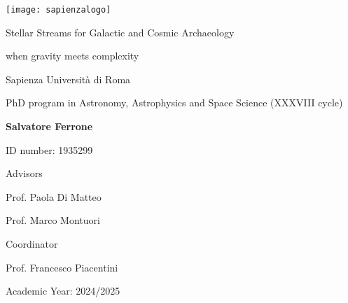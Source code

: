 \begin{titlepage}
\linespread{1}\selectfont
{}
\sffamily
\setlength{\parindent}{0pt}

\vspace*{-10mm}

\texttt{[image: sapienzalogo]}

\vspace{1cm}

\vfill

\vfill
\hspace{1.5cm}
\begin{minipage}{0.75\textwidth}
    {\LARGE\linespread{1.1}\selectfont\textcolor{sapred}{Stellar Streams for Galactic and Cosmic Archaeology}\par}
\end{minipage}

\hspace{1.5cm}
\begin{minipage}{0.75\textwidth}
    {\large\linespread{1.1}\selectfont\textcolor{sapred}{when gravity meets complexity}\par}
\end{minipage}

\vfill
\vfill
\vfill
\hspace{1.5cm}
\textcolor{sapred}{Sapienza Università di Roma}

\hspace{1.5cm}
\textcolor{sapred}{PhD program in Astronomy, Astrophysics and Space Science (XXXVIII cycle)}

\vfill
\hspace{1.5cm}
{\bfseries Salvatore Ferrone}

\hspace{1.5cm}
ID number: 1935299

\vfill
\hspace{1.5cm}
Advisors

\hspace{1.5cm}
Prof. Paola Di Matteo

\hspace{1.5cm}
Prof. Marco Montuori


\vfill
\hspace{1.5cm}
Coordinator

\hspace{1.5cm}
Prof. Francesco Piacentini

\vfill 

\hspace{1.5cm}
Academic Year: 2024/2025


\end{titlepage}